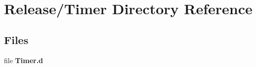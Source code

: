 \section{Release/\+Timer Directory Reference}
\label{dir_ae4f38b16b0dde4e8992730743c94516}
\subsection*{Files}
\begin{DoxyCompactItemize}
\item 
file {\bfseries Timer.\+d}
\end{DoxyCompactItemize}
